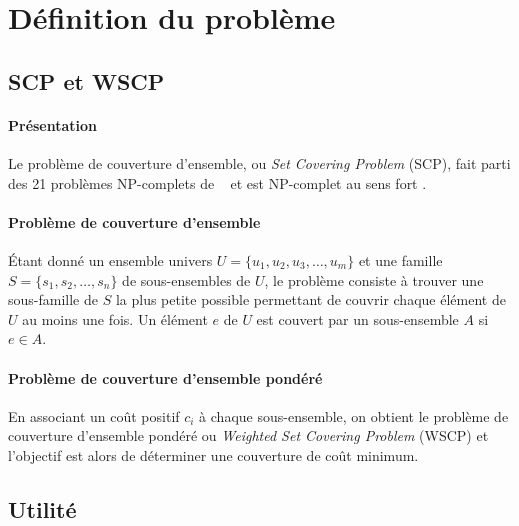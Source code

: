 \documentclass[12pt,letterpaper,twoside]{article}
\begin{document}
	\maketitle{}
	\tableofcontents{}
	\newpage{}
	\section{Définition du problème}
		\subsection{SCP et WSCP}
			\paragraph*{Présentation\\}
				Le problème de couverture d'ensemble, ou \emph{Set Covering Problem} (SCP),
				fait parti des 21 problèmes NP-complets de \citeauthor{Karp1972}~\cite{Karp1972}
				et est NP-complet au sens fort \cite{garey2002computers}.
			\paragraph*{Problème de couverture d'ensemble\\}
				Étant donné un ensemble univers \(U = \{u_1, u_2, u_3, \dots, u_m\}\) et une famille \(S = \{s_1, s_2, \dots, s_n\}\) de sous-ensembles de \(U\),
				le problème consiste à trouver une sous-famille de \(S\) la plus petite possible permettant de couvrir chaque élément de \(U\)
				au moins une fois. Un élément \(e\) de \(U\) est couvert par un sous-ensemble \(A\) si \(e \in A\).
			\paragraph*{Problème de couverture d'ensemble pondéré\\}
				En associant un coût positif \(c_i\) à chaque sous-ensemble, on obtient le problème de couverture d'ensemble pondéré ou \emph{Weighted Set Covering Problem} (WSCP) et	l'objectif est alors de déterminer une couverture de coût minimum.~\cite{Vazirani2003}
		\subsection{Utilité}
\end{document}
